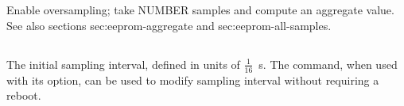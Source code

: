 \subsection{}
\label{sec:eeprom-num-samples}
Enable oversampling; take NUMBER samples and compute an aggregate
value. See also sections {sec:eeprom-aggregate} and
{sec:eeprom-all-samples}.
\subsection{}
\label{sec:eeprom-sampling-interval}
The initial sampling interval, defined in units of
$\frac{1}{16}$\SI{}{s}. The  command, when used with
its  option, can be used to modify sampling
interval without requiring a reboot.


